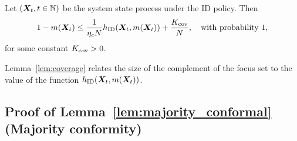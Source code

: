 \begin{lemma}\label{lem:coverage}
Let $({\bm{X}}_t,t\in\mathbb{N})$ be the system state process under the ID policy.
Then
\begin{align*}
    1-m({\bm{X}}_t)\leq \frac{1}{\eta_c N}h_{\textnormal{ID}}({\bm{X}}_t,m({\bm{X}}_t)) + \frac{K_{\text{cov}}}{N},\quad\text{with probability }1,
\end{align*}
for some constant $K_{\text{cov}}>0$.
\end{lemma}
Lemma~\ref{lem:coverage} relates the size of the complement of the focus set to the value of the function $h_{\textnormal{ID}}({\bm{X}}_t,m({\bm{X}}_t))$.


\subsection{Proof of Lemma~\ref{lem:majority_conformal} (Majority conformity)}
